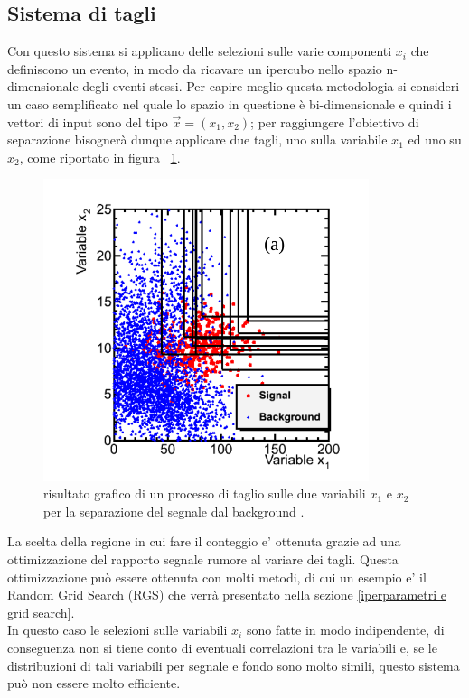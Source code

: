 \newpage


\subsection{Sistema di tagli}
\label{sistema di tagli}
Con questo sistema si applicano delle selezioni sulle varie componenti $x_i$ che definiscono un evento, in modo da ricavare un ipercubo nello spazio n-dimensionale degli eventi stessi. Per capire meglio questa metodologia si consideri un caso semplificato nel quale lo spazio in questione è bi-dimensionale e quindi i vettori di input sono del tipo $\vec{x} = (x_1,x_2)$; per raggiungere l'obiettivo di separazione bisognerà dunque applicare due tagli, uno sulla variabile $x_1$ ed uno su $x_2$, come riportato in figura ~\ref{fig:grid_example}.

\begin{figure}[h!]
	\centering
	\includegraphics[width=0.85\textwidth]{figs/Grid_example.png}
	\caption{risultato grafico di un processo di taglio sulle due variabili $x_1$ e $x_2$ per la separazione del segnale dal background \cite{Metodi_multivariati}.}
	\label{fig:grid_example}
\end{figure}

La scelta della regione in cui fare il conteggio e' ottenuta grazie ad una ottimizzazione del rapporto segnale rumore al variare dei tagli. Questa ottimizzazione può essere ottenuta con molti metodi, di cui un esempio e' il Random Grid Search (RGS) che verrà presentato nella sezione \ref{iperparametri e grid search}. \\
In questo caso le selezioni sulle variabili $x_i$ sono fatte in modo indipendente, di conseguenza non si tiene conto di eventuali correlazioni tra le variabili e, se le distribuzioni di tali variabili per segnale e fondo sono molto simili, questo sistema può non essere molto efficiente.


